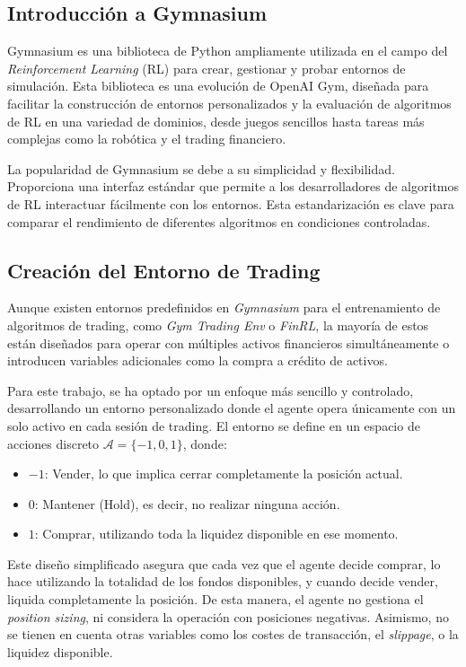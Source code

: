\documentclass[a4paper,12pt, twoside]{report}
\begin{document}
\subsection{Introducción a Gymnasium}

Gymnasium es una biblioteca de Python ampliamente utilizada en el campo del 
\textit{Reinforcement Learning} (RL) para crear, gestionar y probar entornos 
de simulación. Esta biblioteca es una evolución de OpenAI Gym, diseñada para 
facilitar la construcción de entornos personalizados y la evaluación de algoritmos 
de RL en una variedad de dominios, desde juegos sencillos hasta tareas más complejas 
como la robótica y el trading financiero.

La popularidad de Gymnasium se debe a su simplicidad y flexibilidad. Proporciona una 
interfaz estándar que permite a los desarrolladores de algoritmos de RL interactuar 
fácilmente con los entornos. Esta estandarización es clave para comparar el rendimiento 
de diferentes algoritmos en condiciones controladas.

\subsection{Creación del Entorno de Trading}

Aunque existen entornos predefinidos en \textit{Gymnasium} para el entrenamiento de 
algoritmos de trading, como \textit{Gym Trading Env} o \textit{FinRL}, la mayoría 
de estos están diseñados para operar con múltiples activos financieros simultáneamente 
o introducen variables adicionales como la compra a crédito de activos. 

Para este trabajo, se ha optado por un enfoque más sencillo y controlado, desarrollando 
un entorno personalizado donde el agente opera únicamente con un solo activo en cada 
sesión de trading. El entorno se define en un espacio de acciones discreto 
$\mathcal{A} = \{-1, 0, 1\}$, donde:

\begin{itemize}
    \item $-1$: Vender, lo que implica cerrar completamente la posición actual.
    \item $0$: Mantener (Hold), es decir, no realizar ninguna acción.
    \item $1$: Comprar, utilizando toda la liquidez disponible en ese momento.
\end{itemize}

Este diseño simplificado asegura que cada vez que el agente decide comprar, 
lo hace utilizando la totalidad de los fondos disponibles, y cuando decide vender, 
liquida completamente la posición. De esta manera, el agente no gestiona el 
\textit{position sizing}, ni considera la operación con posiciones negativas. 
Asimismo, no se tienen en cuenta otras variables como los costes de transacción, 
el \textit{slippage}, o la liquidez disponible.
\end{document}
